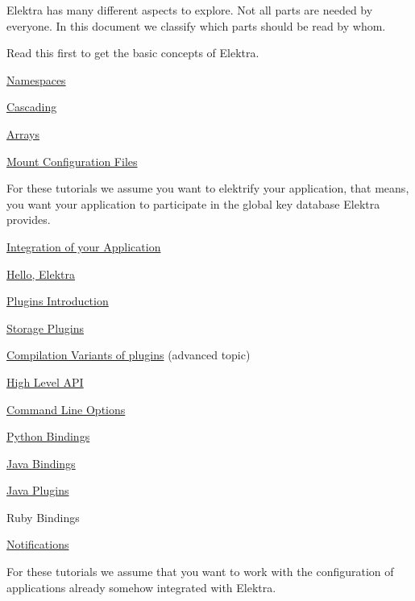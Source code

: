 Elektra has many different aspects to explore. Not all parts are needed by everyone. In this document we classify which parts should be read by whom.

Read this first to get the basic concepts of Elektra.


\begin{DoxyItemize}
\item \hyperlink{doc_tutorials_namespaces_md}{Namespaces}
\item \hyperlink{doc_tutorials_cascading_md}{Cascading}
\item \hyperlink{doc_tutorials_arrays_md}{Arrays}
\item \hyperlink{doc_tutorials_mount_md}{Mount Configuration Files}
\end{DoxyItemize}

For these tutorials we assume you want to elektrify your application, that means, you want your application to participate in the global key database Elektra provides.


\begin{DoxyItemize}
\item \hyperlink{doc_tutorials_application-integration_md}{Integration of your Application}
\item \hyperlink{doc_tutorials_hello-elektra_md}{Hello, Elektra}
\item \hyperlink{doc_tutorials_plugins_md}{Plugins Introduction}
\item \hyperlink{doc_tutorials_storage-plugins_md}{Storage Plugins}
\item \hyperlink{doc_tutorials_compilation-variants_md}{Compilation Variants of plugins} (advanced topic)
\item \hyperlink{doc_tutorials_highlevel_md}{High Level A\+PI}
\item \hyperlink{doc_tutorials_command-line-options_md}{Command Line Options}
\item \hyperlink{doc_tutorials_python-kdb_md}{Python Bindings}
\item \hyperlink{doc_tutorials_java-kdb_md}{Java Bindings}
\item \hyperlink{doc_tutorials_java-plugins_md}{Java Plugins}
\item Ruby Bindings
\item \hyperlink{doc_tutorials_notifications_md}{Notifications}
\end{DoxyItemize}

For these tutorials we assume that you want to work with the configuration of applications already somehow integrated with Elektra.


